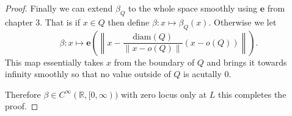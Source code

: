 \documentclass[letter]{article}
\newenvironment{menumerate}{%
  \edef\backupindent{\the\parindent}%
  \enumerate%
  \setlength{\parindent}{\backupindent}%
}{\endenumerate}
\begin{document}
\begin{menumerate}
\begin{proof}
		Finally we can extend $\beta_Q$ to the whole space smoothly using $\textbf{e}$ from chapter $3$. That is if $x \in Q$ then define $\beta: x \mapsto \beta_Q(x).$ Otherwise we let
		\begin{equation}
			\beta: x \mapsto \textbf{e}\left(\left\|x - \frac{\text{diam}(Q)}{\|x - o(Q)\|}(x - o(Q))  \right\|\right).
		\end{equation}
		This map essentially takes $x$ from the boundary of $Q$ and brings it towards infinity smoothly so that no value outside of $Q$ is acutally $0$.

		Therefore $\beta \in C^\infty(\mathbb{R}, [0, \infty))$ with zero locus only at $L$ this completes the proof.
	\end{proof}
	\item 

\end{menumerate}
\end{document}
